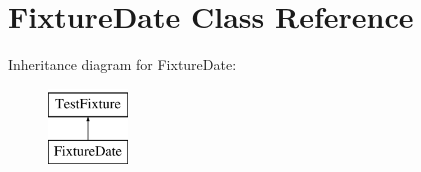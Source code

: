 \hypertarget{classFixtureDate}{\section{Fixture\-Date Class Reference}
\label{classFixtureDate}
}
Inheritance diagram for Fixture\-Date\-:\begin{figure}[H]
\begin{center}
\leavevmode
\includegraphics[height=2.000000cm]{classFixtureDate}
\end{center}
\end{figure}
